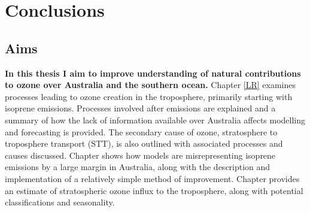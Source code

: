 \chapter{Conclusions} %
\label{Conclusions}


\section{Aims}
\label{Conclusions:aims}

  
  \textbf{In this thesis I aim to improve understanding of natural contributions to ozone over Australia and the southern ocean.}
  Chapter \ref{LR} examines processes leading to ozone creation in the troposphere, primarily starting with isoprene emissions.
  Processes involved after emissions are explained and a summary of how the lack of information available over Australia affects modelling and forecasting is provided.
  The secondary cause of ozone, stratosphere to troposphere transport (STT), is also outlined with associated processes and causes discussed.
  Chapter  shows how models are misrepresenting isoprene emissions by a large margin in Australia, along with the description and implementation of a relatively simple method of improvement.
  Chapter  provides an estimate of stratospheric ozone influx to the troposphere, along with potential classifications and seasonality.
  
  
  
